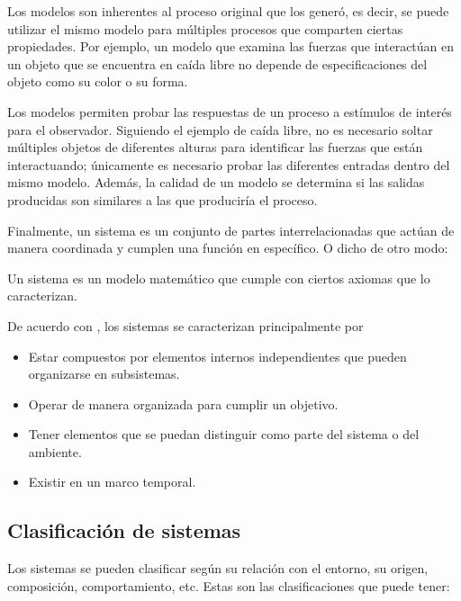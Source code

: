 Los modelos son inherentes al proceso original que los generó, es decir, se puede utilizar el mismo modelo para múltiples procesos que comparten ciertas propiedades. Por ejemplo, un modelo que examina las fuerzas que interactúan en un objeto que se encuentra en caída libre no depende de especificaciones del objeto como su color o su forma.

Los modelos permiten probar las respuestas de un proceso a estímulos de interés para el observador. Siguiendo el ejemplo de caída libre, no es necesario soltar múltiples objetos de diferentes alturas para identificar las fuerzas que están interactuando; únicamente es necesario probar las diferentes entradas dentro del mismo modelo. Además, la calidad de un modelo se determina si las salidas producidas son similares a las que produciría el proceso.

Finalmente, un sistema es un conjunto de partes interrelacionadas que actúan de manera coordinada y cumplen una función en específico. O dicho de otro modo: 

\begin{definition}
	
	Un sistema es un modelo matemático que cumple con ciertos axiomas que lo caracterizan.
	
\end{definition}

De acuerdo con \cite{sistema_1}, los sistemas se caracterizan principalmente por

\begin{itemize}
	
	\item Estar compuestos por elementos internos independientes que pueden organizarse en subsistemas.
	
	\item Operar de manera organizada para cumplir un objetivo.
	
	\item Tener elementos que se puedan distinguir como parte del sistema o del ambiente.
	
	\item Existir en un marco temporal.
	
\end{itemize}

\subsection{Clasificación de sistemas}

Los sistemas se pueden clasificar según su relación con el entorno, su origen, composición, comportamiento, etc. Estas son las clasificaciones que puede tener: 

